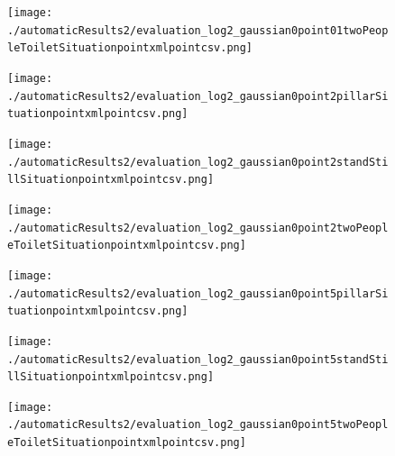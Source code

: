 \documentclass[11pt]{book}
\begin{document}
\begin{figure}
\centering
\texttt{[image: ./automaticResults2/evaluation\_log2\_gaussian0point01twoPeopleToiletSituationpointxmlpointcsv.png]}
\label{evaluation_log2_gaussian0point01twoPeopleToiletSituationpointxmlpointcsv}
\end{figure}

\begin{figure}
\centering
\texttt{[image: ./automaticResults2/evaluation\_log2\_gaussian0point2pillarSituationpointxmlpointcsv.png]}
\label{evaluation_log2_gaussian0point2pillarSituationpointxmlpointcsv}
\end{figure}

\begin{figure}
\centering
\texttt{[image: ./automaticResults2/evaluation\_log2\_gaussian0point2standStillSituationpointxmlpointcsv.png]}
\label{evaluation_log2_gaussian0point2standStillSituationpointxmlpointcsv}
\end{figure}

\begin{figure}
\centering
\texttt{[image: ./automaticResults2/evaluation\_log2\_gaussian0point2twoPeopleToiletSituationpointxmlpointcsv.png]}
\label{evaluation_log2_gaussian0point2twoPeopleToiletSituationpointxmlpointcsv}
\end{figure}

\begin{figure}
\centering
\texttt{[image: ./automaticResults2/evaluation\_log2\_gaussian0point5pillarSituationpointxmlpointcsv.png]}
\label{evaluation_log2_gaussian0point5pillarSituationpointxmlpointcsv}
\end{figure}

\begin{figure}
\centering
\texttt{[image: ./automaticResults2/evaluation\_log2\_gaussian0point5standStillSituationpointxmlpointcsv.png]}
\label{evaluation_log2_gaussian0point5standStillSituationpointxmlpointcsv}
\end{figure}

\begin{figure}
\centering
\texttt{[image: ./automaticResults2/evaluation\_log2\_gaussian0point5twoPeopleToiletSituationpointxmlpointcsv.png]}
\label{evaluation_log2_gaussian0point5twoPeopleToiletSituationpointxmlpointcsv}
\end{figure}
\end{document}
